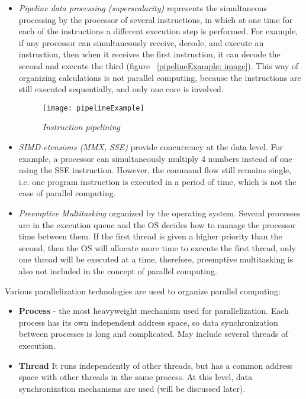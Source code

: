 {		\begin{itemize}
			\item\textit{Pipeline data processing (superscalarity)} represents the simultaneous processing by the processor of several instructions, in which at one time for each of the instructions a different execution step is performed. For example, if any processor can simultaneously receive, decode, and execute an instruction, then when it receives the first instruction, it can decode the second and execute the third (figure ~\ref {pipelineExample: image}). This way of organizing calculations is not parallel computing, because the instructions are still executed sequentially, and only one core is involved.
				\begin{figure}[H]
					\texttt{[image: pipelineExample]}
					\caption{\textit{Instruction pipelining}}
					\label{pipelineExample:image}
				\end{figure}
			\item\textit{SIMD-etensions (MMX, SSE)} provide concurrency at the data level. For example, a processor can simultaneously multiply 4 numbers instead of one using the SSE instruction. However, the command flow still remains single, i.e. one program instruction is executed in a period of time, which is not the case of parallel computing.
			\item\textit{Preemptive Multitasking} organized by the operating system. Several processes are in the execution queue and the OS decides how to manage the processor time between them. If the first thread is given a higher priority than the second, then the OS will allocate more time to execute the first thread, only one thread will be executed at a time, therefore, preemptive multitasking is also not included in the concept of parallel computing.
		\end{itemize}
	\par Various parallelization technologies are used to organize parallel computing:
		\begin{itemize}
			\item\textbf{Process} - the most heavyweight mechanism used for parallelization. Each process has its own independent address space, so data synchronization between processes is long and complicated. May include several threads of execution.
			\item\textbf{Thread} It runs independently of other threads, but has a common address space with other threads in the same process. At this level, data synchronization mechanisms are used (will be discussed later).

\end{itemize}}
